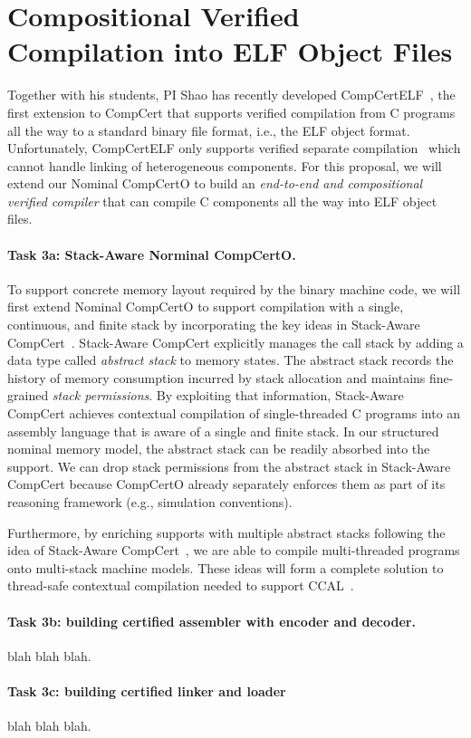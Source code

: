 \section{Compositional Verified Compilation into ELF Object Files}

Together with his students, PI Shao has recently developed
CompCertELF~\cite{compcertelf20}, the first extension to CompCert that
supports verified compilation from C programs all the way to a
standard binary file format, i.e., the ELF object format.
Unfortunately, CompCertELF only supports verified separate
compilation~\cite{sepcompcert} which cannot handle linking of
heterogeneous components.  For this proposal, we will extend our
Nominal CompCertO to build an {\em end-to-end and compositional
  verified compiler} that can compile C components all the way into
ELF object files.

\paragraph*{Task 3a: Stack-Aware Norminal CompCertO.}
To support concrete memory layout required by the binary machine code,
we will first extend Nominal CompCertO to support compilation with a
single, continuous, and finite stack by incorporating the key ideas in
Stack-Aware CompCert~\cite{wang2019,compcertelf20}.  Stack-Aware
CompCert explicitly manages the call stack by adding a data type
called \emph{abstract stack} to memory states. The abstract stack
records the history of memory consumption incurred by stack allocation
and maintains fine-grained \emph{stack permissions}. By exploiting
that information, Stack-Aware CompCert achieves contextual compilation
of single-threaded C programs into an assembly language that is aware
of a single and finite stack.  In our structured nominal memory model,
the abstract stack can be readily absorbed into the support. We can
drop stack permissions from the abstract stack in Stack-Aware CompCert
because CompCertO already separately enforces them as part of its
reasoning framework (e.g., simulation conventions).

Furthermore, by enriching supports with multiple
abstract stacks following the idea of Stack-Aware
CompCert~\cite{wang2019}, we are able to compile multi-threaded
programs onto multi-stack machine models. These ideas will form a complete
solution to thread-safe contextual compilation needed to support
CCAL~\cite{ccal18}.


\paragraph*{Task 3b: building certified assembler with encoder and decoder.}
blah blah blah.


\paragraph*{Task 3c: building certified linker and loader}
blah blah blah.

   
   
